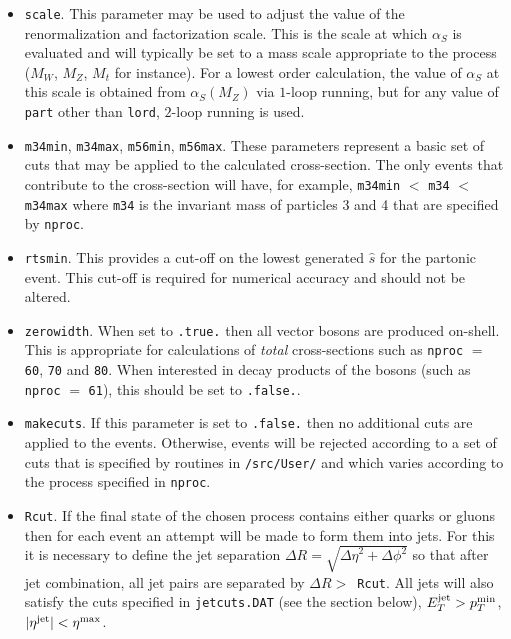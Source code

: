 \documentclass[12pt]{article}
\begin{document}
\begin{itemize}
\item {\tt scale}. This parameter may be used to adjust the value
of the renormalization and factorization scale. This is the scale
at which $\alpha_S$ is evaluated and will typically be set to
a mass scale appropriate to the process ($M_W$, $M_Z$, $M_t$ for
instance). For a lowest order calculation, the value of $\alpha_S$ at
this scale is obtained from $\alpha_S(M_Z)$ via $1$-loop running, but
for any value of {\tt part} other than {\tt lord}, $2$-loop
running is used.

\item {\tt m34min}, {\tt m34max}, {\tt m56min}, {\tt m56max}.
These parameters represent a basic set of cuts that may be applied
to the calculated cross-section. The only events that contribute to
the cross-section will have, for example,
{\tt m34min} $<$ {\tt m34} $<$ {\tt m34max} where {\tt m34} is the
invariant mass of particles 3 and 4 that are specified by {\tt nproc}.

\item {\tt rtsmin}. This provides a cut-off on the lowest generated
$\hat{s}$ for the partonic event. This cut-off is required for
numerical accuracy and should not be altered.

\item {\tt zerowidth}. When set to {\tt .true.} then all vector
bosons are produced on-shell. This is appropriate for calculations
of {\it total} cross-sections such as {\tt nproc} $=$ {\tt 60},
{\tt 70} and {\tt 80}. When interested in decay products of the
bosons (such as {\tt nproc} $=$ {\tt 61}), this should be set
to {\tt .false.}.

\item {\tt makecuts}. If this parameter is set to {\tt .false.} then
no additional cuts are applied to the events. Otherwise, events will
be rejected according to a set of cuts that is specified by routines
in {\tt /src/User/} and which varies according to the process
specified in {\tt nproc}. 

\item {\tt Rcut}. If the final state of the chosen process contains
either quarks or gluons then for each event an attempt will be made
to form them into jets. For this it is necessary to define the
jet separation $\Delta R=\sqrt{{\Delta \eta}^2 + {\Delta \phi}^2}$
so that after jet combination, all jet pairs are separated by
$\Delta R >$~{\tt Rcut}. All jets will also satisfy the cuts
specified in {\tt jetcuts.DAT} (see the section below),
$E_T^{\rm jet} > p_T^{\rm min}$, $|\eta^{\rm jet}| < \eta^{\rm max}$.


\end{itemize}
\end{document}
